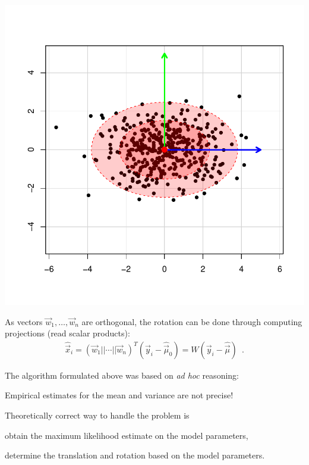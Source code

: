 \documentclass[landscape,footrule]{foils}
\begin{document}
\begin{center}
\includegraphics[scale=0.45]{rotated-distribution-ii.pdf}
\end{center}\vspace*{-1cm}

As vectors $\vec{w}_1,\ldots,\vec{w}_n$ are orthogonal, the rotation can be done through computing projections (read scalar products):
\begin{align*}
\hat{\vec{x}}_i= (\vec{w}_1 ||\cdots|| \vec{w}_n)^T (\vec{y}_i-\hat{\vec{\mu}}_0)=W(\vec{y}_i-\hat{\vec{\mu}})\enspace.
\end{align*}  



The algorithm formulated above was based on \emph{ad hoc} reasoning:
\begin{triangles}
\item Empirical estimates for the mean and variance are not precise!
\end{triangles}\vspace*{1.5cm}

Theoretically correct way to handle the problem is
\begin{triangles}
\item obtain the maximum likelihood estimate on the model parameters,
\item determine the translation and rotation based on the model parameters.
\end{triangles}\vspace*{1.5cm}
\end{document}

